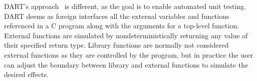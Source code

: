 

{\sc DART}'s approach~\cite{DART-PLDI05} is different, as the goal is to enable automated unit testing. DART deems as foreign interfaces all the external variables and functions referenced in a C program along with the arguments for a top-level function.
External functions are simulated by nondeterministically returning any value of their specified return type. Library functions are normally not considered external functions as they are controlled by the program, but in practice the user can adjust the boundary between library and external functions to simulate the desired effects.

